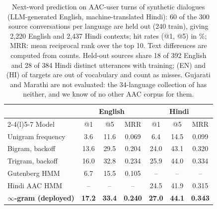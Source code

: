 \begin{table}[t]
\centering\footnotesize
\setlength{\tabcolsep}{3pt}
\begin{tabular}{@{}lcccccc@{}}
\toprule
 & \multicolumn{3}{c}{English} & \multicolumn{3}{c}{Hindi} \\
\cmidrule(lr){2-4}\cmidrule(l){5-7}
Model & @1 & @5 & MRR & @1 & @5 & MRR \\
\midrule
Unigram frequency & 3.6 & 11.6 & 0.069 & 6.4 & 14.5 & 0.099 \\
Bigram, backoff & 13.6 & 29.5 & 0.204 & 24.0 & 43.1 & 0.320 \\
Trigram, backoff & 16.0 & 32.8 & 0.234 & 25.9 & 44.0 & 0.334 \\
Gutenberg HMM & 6.7 & 15.5 & 0.105 & -- & -- & -- \\
Hindi AAC HMM & -- & -- & -- & 24.5 & 41.9 & 0.315 \\
\midrule
\rowcolor{rowtint}\textbf{$\infty$-gram (deployed)} & \textbf{17.2} & \textbf{33.4} & \textbf{0.240} & \textbf{27.0} & \textbf{44.1} & \textbf{0.343} \\
\bottomrule
\end{tabular}
\caption{Next-word prediction on AAC-user turns of synthetic dialogues (LLM-generated English, machine-translated Hindi): 60 of the 300 source conversations per language are held out (240 train), giving 2,220 English and 2,437 Hindi contexts; hit rates (@1, @5) in \%; MRR: mean reciprocal rank over the top 10. Text differences are computed from counts. Held-out sources share 18 of 392 English and 28 of 384 Hindi distinct utterances with training; \PredOOVEN{} (EN) and \PredOOVHI{} (HI) of targets are out of vocabulary and count as misses. Gujarati and Marathi are not evaluated: the 34-language collection of \citet{vertanen2026multilingual} has neither, and we know of no other AAC corpus for them.}
\label{tab:pred}
\end{table}

